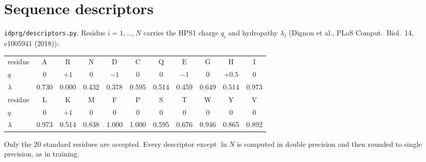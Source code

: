 \documentclass[11pt]{article}
\begin{document}
\section{Sequence descriptors}\label{sec:desc}
\texttt{idprg/descriptors.py}. Residue $i=1,\dots,N$ carries the HPS1 charge $q_i$ and hydropathy $\lambda_i$ (Dignon
et al., PLoS Comput.\ Biol.\ 14, e1005941 (2018)):

\begin{center}
\small
\begin{tabular}{@{}l *{10}{c}@{}}
\toprule
residue & A & R & N & D & C & Q & E & G & H & I\\
$q$ & 0 & $+1$ & 0 & $-1$ & 0 & 0 & $-1$ & 0 & $+0.5$ & 0\\
$\lambda$ & 0.730 & 0.000 & 0.432 & 0.378 & 0.595 & 0.514 & 0.459 & 0.649 & 0.514 & 0.973\\
\midrule
residue & L & K & M & F & P & S & T & W & Y & V\\
$q$ & 0 & $+1$ & 0 & 0 & 0 & 0 & 0 & 0 & 0 & 0\\
$\lambda$ & 0.973 & 0.514 & 0.838 & 1.000 & 1.000 & 0.595 & 0.676 & 0.946 & 0.865 & 0.892\\
\bottomrule
\end{tabular}
\end{center}
Only the 20 standard residues are accepted. Every descriptor except $\ln N$ is computed in double precision and then
rounded to single precision, as in training.
\end{document}

